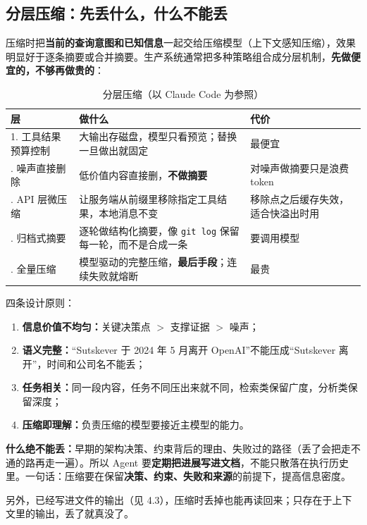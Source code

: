 \subsection{分层压缩：先丢什么，什么不能丢}
压缩时把\textbf{当前的查询意图和已知信息}一起交给压缩模型（上下文感知压缩），效果明显好于逐条摘要或合并摘要。生产系统通常把多种策略组合成分层机制，\textbf{先做便宜的，不够再做贵的}：
\begin{table}[H]
\centering
\caption{分层压缩（以 Claude Code 为参照）}
\label{tab:layered-compaction}
\begin{tabular}{p{3.4cm} p{6.6cm} p{4.6cm}}
  \toprule
  层 & 做什么 & 代价 \\
  \midrule
  1. 工具结果预算控制 & 大输出存磁盘，模型只看预览；替换一旦做出就固定 & 最便宜 \\
  \addlinespace
  2. 噪声直接删除 & 低价值内容直接删，\textbf{不做摘要} & 对噪声做摘要只是浪费 token \\
  \addlinespace
  3. API 层微压缩 & 让服务端从前缀里移除指定工具结果，本地消息不变 & 移除点之后缓存失效，适合快溢出时用 \\
  \addlinespace
  4. 归档式摘要 & 逐轮做结构化摘要，像 \texttt{git log} 保留每一轮，而不是合成一条 & 要调用模型 \\
  \addlinespace
  5. 全量压缩 & 模型驱动的完整压缩，\textbf{最后手段}；连续失败就熔断 & 最贵 \\
  \bottomrule
\end{tabular}
\end{table}

四条设计原则：
\begin{enumerate}
  \item \textbf{信息价值不均匀：}关键决策点 $>$ 支撑证据 $>$ 噪声；
  \item \textbf{语义完整：}“Sutskever 于 2024 年 5 月离开 OpenAI”不能压成“Sutskever 离开”，时间和公司名不能丢；
  \item \textbf{任务相关：}同一段内容，任务不同压出来就不同，检索类保留广度，分析类保留深度；
  \item \textbf{压缩即理解：}负责压缩的模型要接近主模型的能力。
\end{enumerate}
\begin{tcolorbox}[enhanced, sharp corners, boxrule=0pt, frame hidden,
                  borderline west={3pt}{0pt}{structurecolor},
                  colback=structurecolor!5]
\textbf{什么绝不能丢：}早期的架构决策、约束背后的理由、失败过的路径（丢了会把走不通的路再走一遍）。所以 Agent 要\textbf{定期把进展写进文档}，不能只散落在执行历史里。一句话：压缩要在保留\textbf{决策、约束、失败和来源}的前提下，提高信息密度。
\end{tcolorbox}
另外，已经写进文件的输出（见 4.3），压缩时丢掉也能再读回来；只存在于上下文里的输出，丢了就真没了。

